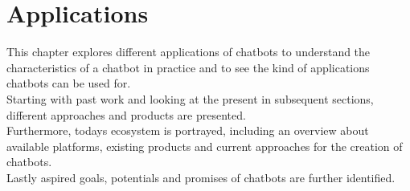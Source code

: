 \chapter{Applications}


This chapter explores different applications of chatbots
to understand the characteristics of a chatbot in practice and to see the kind of applications chatbots can be used for.
\\
Starting with past work and looking at the present in subsequent sections,
different approaches and products are presented.
\\
Furthermore, todays ecosystem is portrayed,
including an overview about available platforms,
existing products
and current approaches for the creation of chatbots.
\\
Lastly aspired goals, potentials and promises of chatbots are further identified.
